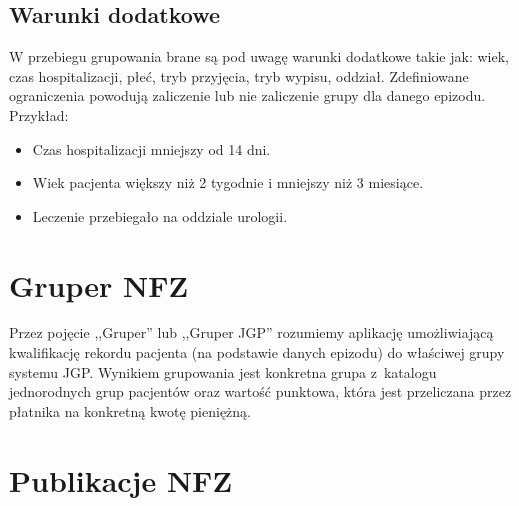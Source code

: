 
\subsection{Warunki dodatkowe}
\label{sec:warunkiDodatkowe}

W przebiegu grupowania brane są pod uwagę warunki dodatkowe takie jak: wiek, czas hospitalizacji, płeć, tryb przyjęcia, tryb wypisu, oddział. Zdefiniowane ograniczenia powodują zaliczenie lub nie zaliczenie grupy dla danego epizodu.
Przykład:
\begin{itemize}
\item Czas hospitalizacji mniejszy od 14 dni.
\item Wiek pacjenta większy niż 2 tygodnie i mniejszy niż 3 miesiące.
\item Leczenie przebiegało na oddziale urologii.
\end{itemize}


\section{Gruper NFZ}
\label{sec:gruperNFZ}

Przez pojęcie ,,Gruper'' lub ,,Gruper JGP'' rozumiemy aplikację umożliwiającą kwalifikację rekordu pacjenta (na podstawie danych epizodu) do właściwej grupy systemu JGP. Wynikiem grupowania jest konkretna grupa z~katalogu jednorodnych grup pacjentów oraz wartość punktowa, która jest przeliczana przez płatnika na konkretną kwotę pieniężną.


\section{Publikacje NFZ}
\label{sec:publikacjeNFZ}


